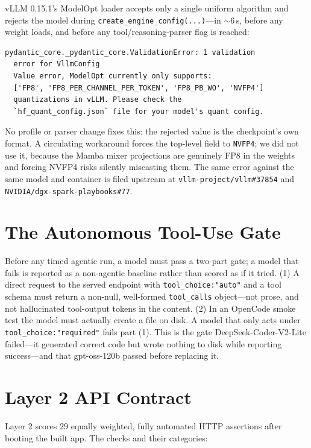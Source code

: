 \documentclass[10pt,twocolumn]{article}
\newcommand{\code}[1]{\texttt{\small #1}}
\begin{document}
vLLM 0.15.1's ModelOpt loader accepts only a single uniform algorithm and rejects the model
during \code{create\_engine\_config(...)}---in ${\sim}6$\,s, before any weight loads, and
before any tool/reasoning-parser flag is reached:

\begin{lstlisting}
pydantic_core._pydantic_core.ValidationError: 1 validation
  error for VllmConfig
  Value error, ModelOpt currently only supports:
  ['FP8', 'FP8_PER_CHANNEL_PER_TOKEN', 'FP8_PB_WO', 'NVFP4']
  quantizations in vLLM. Please check the
  `hf_quant_config.json` file for your model's quant config.
\end{lstlisting}

No profile or parser change fixes this: the rejected value is the checkpoint's own format. A
circulating workaround forces the top-level field to \code{NVFP4}; we did not use it, because
the Mamba mixer projections are genuinely FP8 in the weights and forcing NVFP4 risks silently
miscasting them. The same error against the same model and container is filed upstream at
\code{vllm-project/vllm\#37854} and \code{NVIDIA/dgx-spark-playbooks\#77}.

\section{The Autonomous Tool-Use Gate}
\label{app:gate}

Before any timed agentic run, a model must pass a two-part gate; a model that fails is reported
as a non-agentic baseline rather than scored as if it tried. (1) A direct request to the served
endpoint with \code{tool\_choice:"auto"} and a tool schema must return a non-null, well-formed
\code{tool\_calls} object---not prose, and not hallucinated tool-output tokens in the content.
(2) In an OpenCode smoke test the model must actually create a file on disk. A model that only
acts under \code{tool\_choice:"required"} fails part (1). This is the gate DeepSeek-Coder-V2-Lite
failed---it generated correct code but wrote nothing to disk while reporting success---and that
gpt-oss-120b passed before replacing it.

\section{Layer 2 API Contract}
\label{app:contract}

Layer 2 scores 29 equally weighted, fully automated HTTP assertions after booting the built
app. The checks and their categories:
\end{document}
